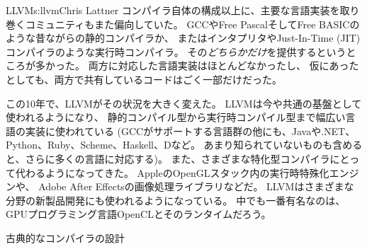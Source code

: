 \begin{aosachapter}{LLVM}{s:llvm}{Chris Lattner}
コンパイラ自体の構成以上に、主要な言語実装を取り巻くコミュニティもまた偏向していた。
GCCやFree PascalそしてFree BASICのような昔ながらの静的コンパイラか、
またはインタプリタやJust-In-Time (JIT)コンパイラのような実行時コンパイラ。
その\emph{どちらかだけ}を提供するというところが多かった。
両方に対応した言語実装はほとんどなかったし、
仮にあったとしても、両方で共有しているコードはごく一部だけだった。

この10年で、LLVMがその状況を大きく変えた。
LLVMは今や共通の基盤として使われるようになり、
静的コンパイル型から実行時コンパイル型まで幅広い言語の実装に使われている
(GCCがサポートする言語群の他にも、Javaや.NET、Python、Ruby、Scheme、Haskell、Dなど。
あまり知られていないものも含めると、さらに多くの言語に対応する)。
また、さまざまな特化型コンパイラにとって代わるようになってきた。
AppleのOpenGLスタック内の実行時特殊化エンジンや、
Adobe After Effectsの画像処理ライブラリなどだ。
LLVMはさまざまな分野の新製品開発にも使われるようになっている。
中でも一番有名なのは、GPUプログラミング言語OpenCLとそのランタイムだろう。

\begin{aosasect1}{古典的なコンパイラの設計}


\end{aosasect1}
\end{aosachapter}

